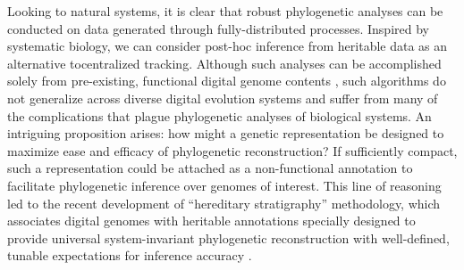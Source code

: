 Looking to natural systems, it is clear that robust phylogenetic analyses can be conducted on data generated through fully-distributed processes.
Inspired by systematic biology, we can consider post-hoc inference from heritable data as an alternative tocentralized tracking.
Although such analyses can be accomplished solely from pre-existing, functional digital genome contents \citep{moreno2021case}, such algorithms do not generalize across diverse digital evolution systems and suffer from many of the complications that plague phylogenetic analyses of biological systems.
An intriguing proposition arises: how might a genetic representation be designed to maximize ease and efficacy of phylogenetic reconstruction?
If sufficiently compact, such a representation could be attached as a non-functional annotation to facilitate phylogenetic inference over genomes of interest.
This line of reasoning led to the recent development of ``hereditary stratigraphy'' methodology, which associates digital genomes with heritable annotations specially designed to provide universal system-invariant phylogenetic reconstruction with well-defined, tunable expectations for inference accuracy
\citep{moreno2022hereditary}.


